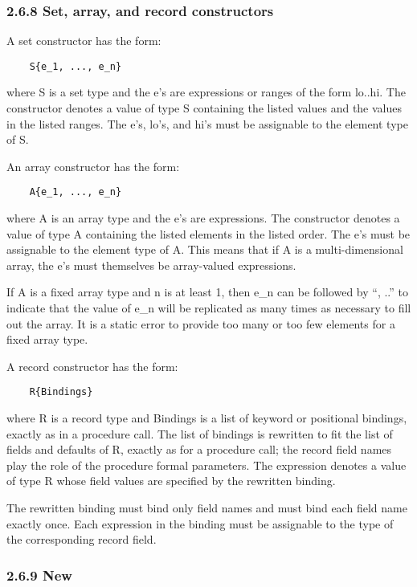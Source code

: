 \documentclass[10pt]{article}
\begin{document}
\subsubsection*{2.6.8 Set, array, and record constructors}

A set constructor has the form:
\begin{verbatim}
    S{e_1, ..., e_n}
\end{verbatim}
where S is a set type and the e's are expressions or ranges of the form
lo..hi.  The constructor denotes a value of type S containing the listed values
and the values in the listed ranges.  The e's, lo's, and hi's must be
assignable to the element type of S.

An array constructor has the form:
\begin{verbatim}
    A{e_1, ..., e_n}
\end{verbatim}
where A is an array type and the e's are expressions.  The constructor denotes
a value of type A containing the listed elements in the listed order.  The e's
must be assignable to the element type of A.  This means that if A is a
multi-dimensional array, the e's must themselves be array-valued expressions.

If A is a fixed array type and n is at least 1, then e\_n can be followed by
``, ..'' to indicate that the value of e\_n will be replicated as many times
as necessary to fill out the array.  It is a static error to provide too many
or too few elements for a fixed array type.

A record constructor has the form:
\begin{verbatim}
    R{Bindings}
\end{verbatim}
where R is a record type and Bindings is a list of keyword or positional
bindings, exactly as in a procedure call.  The list of bindings is rewritten to
fit the list of fields and defaults of R, exactly as for a procedure call; the
record field names play the role of the procedure formal parameters.  The
expression denotes a value of type R whose field values are specified by the
rewritten binding.

The rewritten binding must bind only field names and must bind each field name
exactly once.  Each expression in the binding must be assignable to the type of
the corresponding record field.

\subsubsection*{2.6.9 New}
\end{document}
